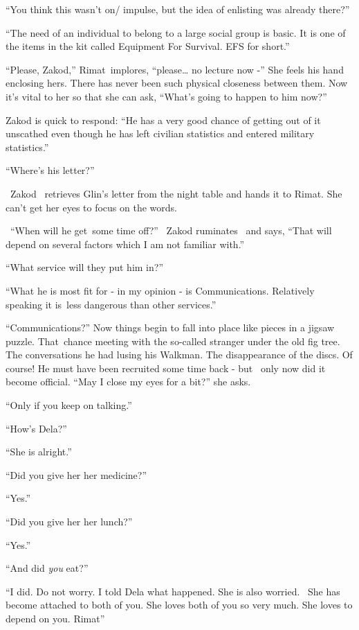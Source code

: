 \documentclass[twoside,11pt]{book}
\begin{document}
{}``You think this wasn't on/ impulse, but the idea of enlisting was already there?''

{}``The need of an individual to belong to a large social group is basic. It is one of the items in the kit called
Equipment For Survival. EFS for short.''

{}``Please, Zakod,'' Rimat~implores, ``please{\dots} no lecture now -'' She feels his hand enclosing hers. There has
never been such physical closeness{ }between them. Now it's vital to her so that she can ask, ``What's
going to happen to him now?''

Zakod is quick to respond: ``He has a very good chance of getting out of it unscathed even though he has
left civilian statistics and entered military statistics.''

``Where's his letter?''

~Zakod~ retrieves Glin's letter from the night table and hands it to Rimat. She can't get her eyes to focus on the
words.

\ {}``When will he get~some time off?'' \ Zakod ruminates \ and says, ``That will depend on several factors
which I am not familiar with.'' \

{}``What service will they put him in?''

{}``What he is most fit for - in my opinion - is Communications. Relatively speaking it is~less dangerous than other
services.''

{}``Communications?'' Now things begin to fall into place like pieces in a jigsaw puzzle. That~chance meeting with the
so-called stranger under the old fig tree. The conversations he had lusing his Walkman. The disappearance of the discs.
Of course! He must have been recruited some time back - but \ only now did it become official. ``May I close my eyes
for a bit?'' she asks.

{}``Only if you keep on talking.''

{}``How's Dela?''

{}``She is alright.''

{}``Did you give her her medicine?''

{}``Yes.''

{}``Did you give her{ }her lunch?''

{}``Yes.''

{}``And did \textit{you} eat?''

{}``I did. Do not worry. I told Dela what happened. She is also worried.~ She has become attached to both of you. She
loves both of you so very much. She loves to depend on you. Rimat''
\end{document}
